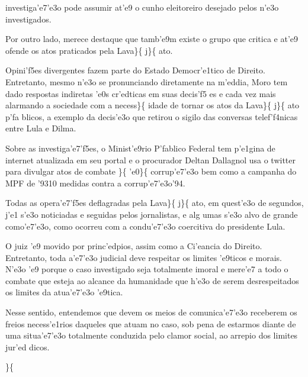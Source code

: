 investiga'e7'e3o pode assumir at'e9 o cunho eleitoreiro desejado pelos
n'e3o investigados. \par \tab Por outro lado, merece destaque que
tamb'e9m existe o grupo que critica e at'e9 ofende os atos praticados
pela Lava\}\{\rtlch{}  \ltrch{} 
j\}\{\rtlch{}  \ltrch{}  ato.
\par \tab Opini'f5es divergentes fazem parte do Estado Democr'e1tico de
Direito. Entretanto, mesmo n'e3o se pronunciando diretamente na m'eddia,
Moro tem dado respostas indiretas 'e0s cr'edticas em suas decis'f5 es e
cada vez mais alarmando a sociedade com a necess\}\{\rtlch{} 
\ltrch{}  idade de tornar os atos da
Lava\}\{\rtlch{}  \ltrch{}  j\}\{\rtlch{}
 \ltrch{}  ato p'fa blicos, a
exemplo da decis'e3o que retirou o sigilo das conversas telef'f4nicas
entre Lula e Dilma. \par \tab Sobre as investiga'e7'f5es, o Minist'e9rio
P'fablico Federal tem p'e1gina de internet atualizada em seu portal e o
procurador Deltan Dallagnol usa o twitter para divulgar atos de combate
\}\{\rtlch{}  \ltrch{}  'e0\}\{ \rtlch{}
 \ltrch{}  corrup'e7'e3o bem como
a campanha do MPF de '9310 medidas contra a corrup'e7'e3o'94.
\par \tab Todas as opera'e7'f5es deflagradas pela Lava\}\{\rtlch{}
 \ltrch{}  j\}\{\rtlch{}  \ltrch{}
 ato, em quest'e3o de segundos, j'e1
s'e3o noticiadas e seguidas pelos jornalistas, e alg umas s'e3o alvo de
grande como'e7'e3o, como ocorreu com a condu'e7'e3o coercitiva do
presidente Lula. \par \tab O juiz 'e9 movido por princ'edpios, assim
como a Ci'eancia do Direito. Entretanto, toda a'e7'e3o judicial deve
respeitar os limites 'e9ticos e morais. N'e3o 'e9 porque o caso
investigado seja totalmente imoral e mere'e7 a todo o combate que esteja
ao alcance da humanidade que h'e3o de serem desrespeitados os limites da
atua'e7'e3o 'e9tica. \par \tab Nesse sentido, entendemos que devem os
meios de comunica'e7'e3o receberem os freios necess'e1rios daqueles que
atuam no caso, sob pena de estarmos diante de uma situa'e7'e3o
totalmente conduzida pelo clamor social, ao arrepio dos limites jur'ed
dicos. \par  \par \}\{\rtlch{} \ab{} \ltrch{}
